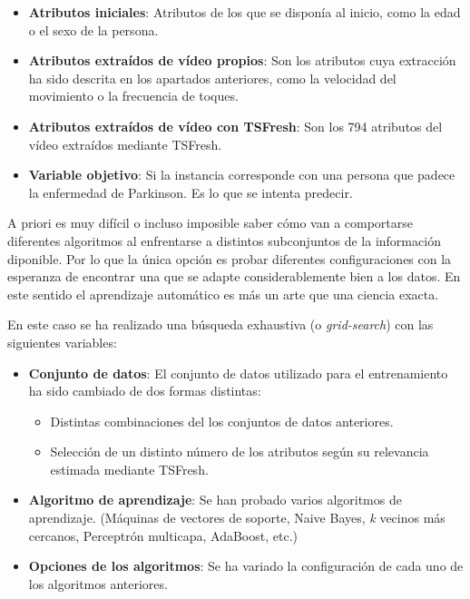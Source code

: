 \begin{itemize}
    \item \textbf{Atributos iniciales}: Atributos de los que se disponía al
    inicio, como la edad o el sexo de la persona.
    \item \textbf{Atributos extraídos de vídeo propios}: Son los atributos cuya
    extracción ha sido descrita en los apartados anteriores, como la velocidad
    del movimiento o la frecuencia de toques.
    \item \textbf{Atributos extraídos de vídeo con TSFresh}: Son los 794
    atributos del vídeo extraídos mediante TSFresh.
    \item \textbf{Variable objetivo}: Si la instancia corresponde con una
    persona que padece la enfermedad de Parkinson. Es lo que se intenta predecir.
\end{itemize}

A priori es muy difícil o incluso imposible saber cómo van a comportarse
diferentes algoritmos al enfrentarse a distintos subconjuntos de la información
diponible. Por lo que la única opción es probar diferentes configuraciones con
la esperanza de encontrar una que se adapte considerablemente bien a los datos.
En este sentido el aprendizaje automático es más un arte que una ciencia exacta.

En este caso se ha realizado una búsqueda exhaustiva (o \textit{grid-search})
con las siguientes variables:

\begin{itemize}
    \item \textbf{Conjunto de datos}: El conjunto de datos utilizado para el
    entrenamiento ha sido cambiado de dos formas distintas:
    \begin{itemize}
        \item Distintas combinaciones del los conjuntos de datos anteriores.
        \item Selección de un distinto número de los atributos según su
        relevancia estimada mediante TSFresh.
    \end{itemize}
    \item \textbf{Algoritmo de aprendizaje}: Se han probado varios algoritmos de
    aprendizaje. (Máquinas de vectores de soporte, Naive Bayes, \textit{k}
    vecinos más cercanos, Perceptrón multicapa, AdaBoost, etc.)
    \item \textbf{Opciones de los algoritmos}: Se ha variado la configuración de
    cada uno de los algoritmos anteriores.
\end{itemize}


